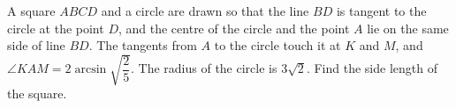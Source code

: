 A square $ABCD$ and a circle are drawn so that the line $BD$ is tangent to the circle at the point $D$, and the centre of the circle and the point $A$ lie on the same side of line $BD$. The tangents from $A$ to the circle touch it at $K$ and $M$, and $\angle KAM=2\arcsin\sqrt{\dfrac{2}{5}}$. The radius of the circle is $3\sqrt2$. Find the side length of the square.

